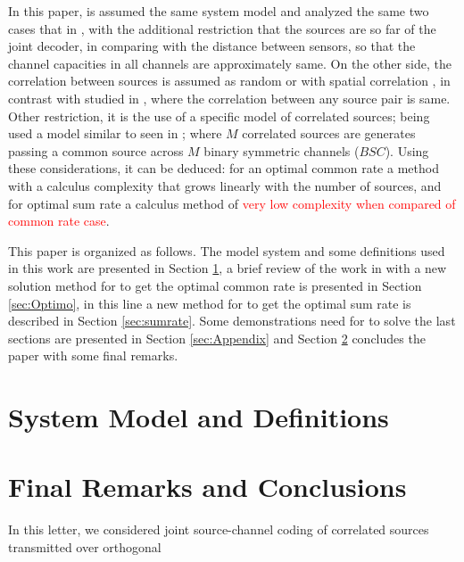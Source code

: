\documentclass[journal]{IEEEtran}
\begin{document}
 In this paper, is assumed the same system 
 model and analyzed the same two cases that 
 in \cite{fernando}, with the additional restriction that the 
 sources are so far of the joint decoder, in comparing with the distance 
 between sensors, so that the channel capacities in all channels are 
 approximately same. On the other side, the correlation between sources is
 assumed as random or with spatial correlation \cite{corrspatial},
 in contrast with studied in \cite{ceobinary1,ceobinary2}, where the correlation
 between any source pair is same. Other restriction, it 
 is the use of a specific model of correlated sources; being used a model similar to seen
 in \cite{ceobinary1,ceobinary2}; where $M$
 correlated sources are generates passing a common source across $M$ binary 
 symmetric channels ($BSC$).
 Using these considerations, it can be deduced: for an optimal common rate a method 
 with a calculus complexity that grows linearly with the number of sources, 
 and for optimal sum rate a calculus method of \textcolor{red}{very low complexity
 when compared of common rate case}. 
 
This paper is organized as follows. The model system and some definitions 
used in this work are presented in Section \ref{sec:SystemModel}, a brief review of the
work in \cite{fernando} with a new solution method for to get the optimal 
common rate is presented in Section \ref{sec:Optimo}, in this line a new method for to get
the optimal sum rate is described in Section \ref{sec:sumrate}. Some demonstrations
need for to solve the last sections are presented in
Section \ref{sec:Appendix} and Section \ref{sec:Conclusions} concludes the paper 
with some final remarks.

\section{System Model and Definitions} 
\label{sec:SystemModel}



\section{Final Remarks and Conclusions} 
\label{sec:Conclusions}
In this letter, we considered joint source-channel coding of correlated
sources transmitted over orthogonal
\end{document}
